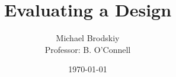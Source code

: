 


\title{Evaluating a Design}
\date{\today}
\author{Michael Brodskiy\\ \small Professor: B. O'Connell}



\maketitle

